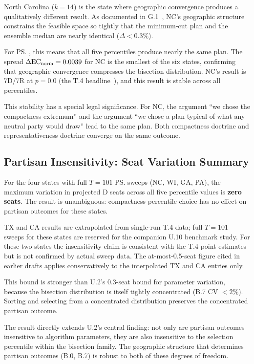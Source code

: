 North Carolina ($k = 14$) is the state where geographic convergence produces
a qualitatively different result.
As documented in G.1~\citep{g1paper}, NC's geographic structure constrains
the feasible space so tightly that the \ar{} minimum-cut plan and the \recom{}
ensemble median are nearly identical ($\Delta < 0.3\%$).

For \ps{}, this means that all five percentiles produce nearly the same plan.
The spread $\Delta\mathrm{EC}_{\mathrm{norm}} = 0.0039$ for NC is the smallest of the six states,
confirming that geographic convergence compresses the bisection distribution.
NC's result is 7D/7R at $p = 0.0$ (the T.4 headline~\citep{b11paper}),
and this result is stable across all percentiles.

This stability has a special legal significance.
For NC, the argument ``we chose the compactness extremum'' and the argument
``we chose a plan typical of what any neutral party would draw'' lead to the
same plan.
Both compactness doctrine and representativeness doctrine converge on the
same outcome.

\subsection{Partisan Insensitivity: Seat Variation Summary}
\label{subsec:bound}

For the four states with full $T = 101$ \ps{} sweeps (NC, WI, GA, PA),
the maximum variation in projected D seats across all five percentile values
is \textbf{zero seats}.
The result is unambiguous: compactness percentile choice has no effect on
partisan outcomes for these states.

TX and CA results are extrapolated from single-run T.4 data;
full $T = 101$ sweeps for these states are reserved for the companion U.10
benchmark study.
For these two states the insensitivity claim is consistent with the T.4
point estimates but is not confirmed by actual sweep data.
The at-most-0.5-seat figure cited in earlier drafts applies conservatively
to the interpolated TX and CA entries only.

This bound is stronger than U.2's 0.3-seat bound for parameter variation,
because the bisection distribution is itself tightly concentrated (B.7 CV
$< 2\%$).
Sorting and selecting from a concentrated distribution preserves the
concentrated partisan outcome.

The result directly extends U.2's central finding: not only are partisan
outcomes insensitive to algorithm parameters, they are also insensitive to
the selection percentile within the bisection family.
The geographic structure that determines partisan outcomes (B.0, B.7) is
robust to both of these degrees of freedom.

